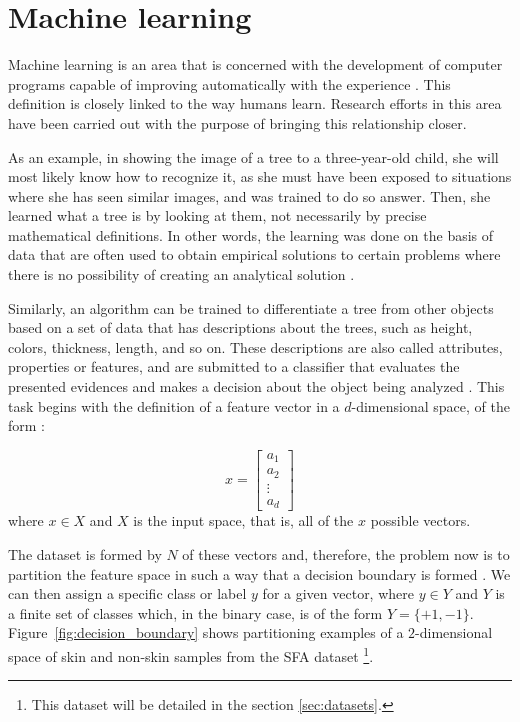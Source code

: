 \section{Machine learning}
\label{sec:classificadores}
Machine learning is an area that is concerned with the development of computer programs capable of improving automatically with the experience \citep{mitchell:97}. This definition is closely linked to the way humans learn. Research efforts in this area have been carried out with the purpose of bringing this relationship closer.

As an example, in showing the image of a tree to a three-year-old child, she will most likely know how to recognize it, as she must have been exposed to situations where she has seen similar images, and was trained to do so answer. Then, she learned what a tree is by looking at them, not necessarily by precise mathematical definitions. In other words, the learning was done on the basis of data that are often used to obtain empirical solutions to certain problems where there is no possibility of creating an analytical solution \citep{mostafa:12}.

Similarly, an algorithm can be trained to differentiate a tree from other objects based on a set of data that has descriptions about the trees, such as height, colors, thickness, length, and so on. These descriptions are also called attributes, properties or features, and are submitted to a classifier that evaluates the presented evidences and makes a decision about the object being analyzed \citep{duda:12}. This task begins with the definition of a feature vector in a $d$-dimensional space, of the form \citep{duda:12}:

\begin{equation}
\label{eq:vetor_caracteristicas}
  x = 
  \begin{bmatrix}
    a_1 \\ a_2 \\ \vdots \\ a_d
  \end{bmatrix}
\end{equation}
\noindent where $x \in X$ and $X$ is the input space, that is, all of the $x$ possible vectors.

The dataset is formed by $N$ of these vectors and, therefore, the problem now is to partition the feature space in such a way that a decision boundary is formed \citep{duda:12}. We can then assign a specific class or label $y$ for a given vector, where $y \in Y$ and $Y$ is a finite set of classes which, in the binary case, is of the form $Y = \{+1, -1\}$. Figure~\ref{fig:decision_boundary} shows partitioning examples of a $2$-dimensional space of skin and non-skin samples from the SFA dataset \footnote{This dataset will be detailed in the section \ref{sec:datasets}.}.

